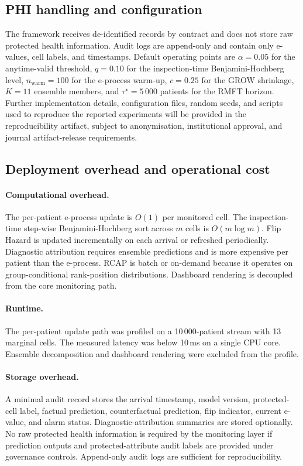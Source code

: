 \documentclass[acmsmall,nonacm,review,anonymous]{acmart}
\newcommand{\1}[1]{\mathbf{1}\!\left\{#1\right\}}
\begin{document}
\subsection{PHI handling and configuration}

The framework receives de-identified records by contract and does not store raw protected health information. Audit logs are append-only and contain only e-values, cell labels, and timestamps. Default operating points are $\alpha = 0.05$ for the anytime-valid threshold, $q = 0.10$ for the inspection-time Benjamini-Hochberg level, $n_{\mathrm{warm}} = 100$ for the e-process warm-up, $c = 0.25$ for the GROW shrinkage, $K = 11$ ensemble members, and $\tau^\star = 5\,000$ patients for the RMFT horizon. Further implementation details, configuration files, random seeds, and scripts used to reproduce the reported experiments will be provided in the reproducibility artifact, subject to anonymisation, institutional approval, and journal artifact-release requirements.

\subsection{Deployment overhead and operational cost}\label{sec:overhead}

\paragraph{Computational overhead.}
The per-patient e-process update is $O(1)$ per monitored cell. The inspection-time step-wise Benjamini-Hochberg sort across $m$ cells is $O(m \log m)$. Flip Hazard is updated incrementally on each arrival or refreshed periodically. Diagnostic attribution requires ensemble predictions and is more expensive per patient than the e-process. RCAP is batch or on-demand because it operates on group-conditional rank-position distributions. Dashboard rendering is decoupled from the core monitoring path.

\paragraph{Runtime.}
The per-patient update path was profiled on a 10\,000-patient stream with 13 marginal cells. The measured latency was below 10\,ms on a single CPU core. Ensemble decomposition and dashboard rendering were excluded from the profile.

\paragraph{Storage overhead.}
A minimal audit record stores the arrival timestamp, model version, protected-cell label, factual prediction, counterfactual prediction, flip indicator, current e-value, and alarm status. Diagnostic-attribution summaries are stored optionally. No raw protected health information is required by the monitoring layer if prediction outputs and protected-attribute audit labels are provided under governance controls. Append-only audit logs are sufficient for reproducibility.
\end{document}
